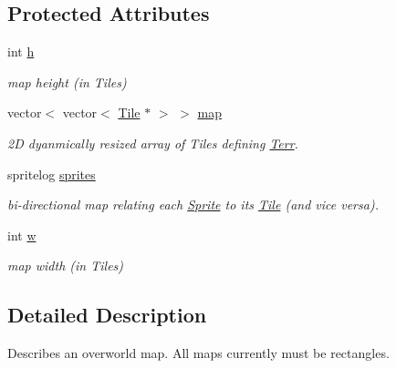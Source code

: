 \subsection*{Protected Attributes}
\begin{DoxyCompactItemize}
\item 
int \hyperlink{class_terr_aa2f06b09cb8abd0fda4abb2b696f6885}{h}\hypertarget{class_terr_aa2f06b09cb8abd0fda4abb2b696f6885}{}\label{class_terr_aa2f06b09cb8abd0fda4abb2b696f6885}

\begin{DoxyCompactList}\small\item\em map height (in Tiles) \end{DoxyCompactList}\item 
vector$<$ vector$<$ \hyperlink{class_tile}{Tile} $\ast$ $>$ $>$ \hyperlink{class_terr_a35de374972704b3d92e76b4bc8e67a9c}{map}\hypertarget{class_terr_a35de374972704b3d92e76b4bc8e67a9c}{}\label{class_terr_a35de374972704b3d92e76b4bc8e67a9c}

\begin{DoxyCompactList}\small\item\em 2D dyanmically resized array of Tiles defining \hyperlink{class_terr}{Terr}. \end{DoxyCompactList}\item 
spritelog \hyperlink{class_terr_a633f21d6e20c549f8006104ae4363bea}{sprites}\hypertarget{class_terr_a633f21d6e20c549f8006104ae4363bea}{}\label{class_terr_a633f21d6e20c549f8006104ae4363bea}

\begin{DoxyCompactList}\small\item\em bi-\/directional map relating each \hyperlink{class_sprite}{Sprite} to its \hyperlink{class_tile}{Tile} (and vice versa). \end{DoxyCompactList}\item 
int \hyperlink{class_terr_af1d43d8b2b20b19d005626831c1335fb}{w}\hypertarget{class_terr_af1d43d8b2b20b19d005626831c1335fb}{}\label{class_terr_af1d43d8b2b20b19d005626831c1335fb}

\begin{DoxyCompactList}\small\item\em map width (in Tiles) \end{DoxyCompactList}\end{DoxyCompactItemize}


\subsection{Detailed Description}
Describes an overworld map. All maps currently must be rectangles. 

